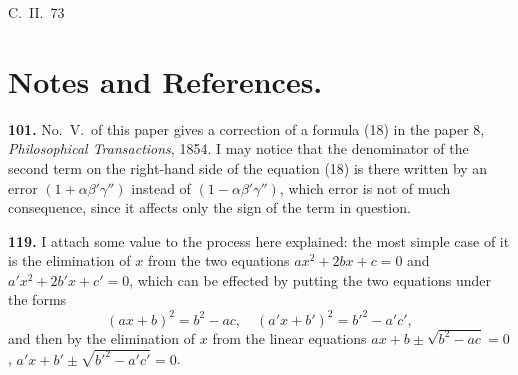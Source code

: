 \documentclass[11pt,a4paper]{article}
\begin{document}
\vspace{2em}
\begin{flushright}
C.~II.\ 73
\end{flushright}

\newpage

\section*{Notes and References.}

\textbf{101.} No.~V.\ of this paper gives a correction of a formula (18) in the paper 8,
\textit{Philosophical Transactions}, 1854. I may notice that the denominator of the second term
on the right-hand side of the equation (18) is there written by an error $(1+\alpha\beta'\gamma'')$
instead of $(1-\alpha\beta'\gamma'')$, which error is not of much consequence, since it affects only the sign
of the term in question.

\textbf{119.} I attach some value to the process here explained: the most simple case of
it is the elimination of $x$ from the two equations $ax^2+2bx+c=0$ and $a'x^2+2b'x+c'=0$,
which can be effected by putting the two equations under the forms
\[
(ax+b)^2 = b^2-ac,\quad (a'x+b')^2 = b'^2-a'c',
\]
and then by the elimination of $x$ from the linear equations $ax+b\pm\sqrt{b^2-ac}=0$,
$a'x+b'\pm\sqrt{b'^2-a'c'}=0$.
\end{document}
